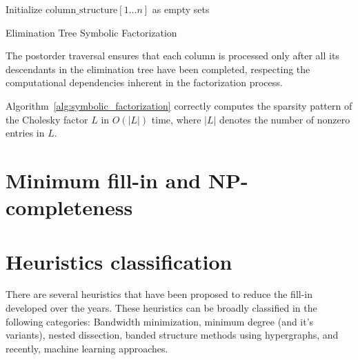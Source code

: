 \begin{algorithm}
\BlankLine
Initialize $\text{column\_structure}[1 \ldots n]$ as empty sets\;
\caption{Elimination Tree Symbolic Factorization}
\label{alg:symbolic_factorization}
\end{algorithm}

The postorder traversal ensures that each column is processed only after all its descendants in the elimination tree have been completed, respecting the computational dependencies inherent in the factorization process.

\begin{theorem}
Algorithm~\ref{alg:symbolic_factorization} correctly computes the sparsity pattern of the Cholesky factor $L$ in $O(|L|)$ time, where $|L|$ denotes the number of nonzero entries in $L$.
\end{theorem}


\section{Minimum fill-in and NP-completeness}

\section{Heuristics classification}
\label{sec:heuristics}

There are several heuristics that have been proposed to reduce the fill-in developed over the years. These heuristics can be broadly classified in the following categories: Bandwidth minimization, minimum degree (and it's variants), nested dissection, banded structure methods using hypergraphs, and recently, machine learning approaches. 

